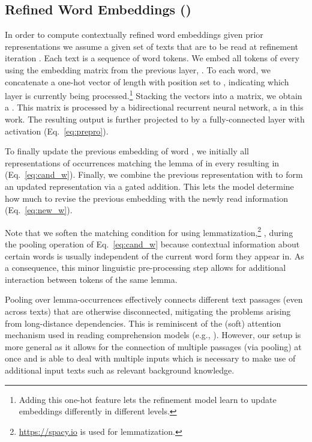 \documentclass[11pt,a4paper]{article}
\begin{document}
\subsection{Refined Word Embeddings ()}
\label{sec:contextual_embeddings}
In order to compute contextually refined word embeddings  given prior representations  we assume a given set of texts  that are to be read at refinement iteration . Each text  is a sequence of word tokens. We embed all tokens of every  using the embedding matrix from the previous layer, . To each word, we concatenate a one-hot vector of length  with position  set to , indicating which layer is currently being processed.\footnote{Adding this one-hot feature lets the refinement model learn to update embeddings differently in different levels.} Stacking the vectors into a matrix, we obtain a . This matrix is processed by a bidirectional recurrent neural network, a  \citep{hochreiter1997long} in this work. The resulting output is further projected to  by a fully-connected layer with  activation (Eq.~\ref{eq:prepro}).



To finally update the previous embedding  of word , we initially  all representations of occurrences matching the lemma of  in every  resulting in  (Eq.~\ref{eq:cand_w}). Finally, we combine the previous representation  with  to form an updated representation  via a gated addition. This lets the model determine how much to revise the previous embedding with the newly read information (Eq.~\ref{eq:new_w}).


\noindent
Note that we soften the matching condition for  using lemmatization,\footnote{\url{https://spacy.io} is used for lemmatization.} , during the pooling operation of Eq.~\ref{eq:cand_w} because contextual information about certain words is usually independent of the current word form  they appear in. As a consequence, this minor linguistic pre-processing step allows for additional interaction between tokens of the same lemma. 

Pooling over lemma-occurrences effectively connects different text passages (even across texts) that are otherwise disconnected, mitigating the problems arising from long-distance dependencies. This is reminiscent of the (soft) attention mechanism used in reading comprehension models (e.g., ). However, our setup is more general as it allows for the connection of multiple passages (via pooling) at once and is able to deal with multiple inputs which is necessary to make use of additional input texts such as relevant background knowledge.
\end{document}
